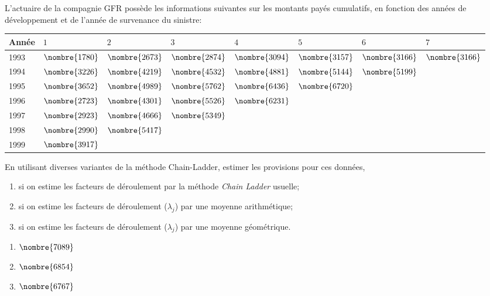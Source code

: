 \begin{exercice}
  L'actuaire de la compagnie GFR possède les informations suivantes
  sur les montants payés cumulatifs, en fonction des années de
  développement et de l'année de survenance du sinistre:
  \begin{center}
    \begin{tabular}{|l|l l l l l l l|}\hline
      Année & $1$ & $2$ & $3$ & $4$ & $5$ & $6$ & $7$\\ \hline
      1993 & $\nombre{1780}$ & $\nombre{2673}$ & $\nombre{2874}$ & $\nombre{3094}$ & $\nombre{3157}$ & $\nombre{3166}$ & $\nombre{3166}$ \\
      1994 & $\nombre{3226}$ & $\nombre{4219}$ & $\nombre{4532}$ & $\nombre{4881}$ & $\nombre{5144}$ & $\nombre{5199}$ & \\
      1995 & $\nombre{3652}$ & $\nombre{4989}$ & $\nombre{5762}$ & $\nombre{6436}$ & $\nombre{6720}$ & & \\
      1996 & $\nombre{2723}$ & $\nombre{4301}$ & $\nombre{5526}$ & $\nombre{6231}$ & & & \\
      1997 & $\nombre{2923}$ & $\nombre{4666}$ & $\nombre{5349}$ & & & & \\
      1998 & $\nombre{2990}$ & $\nombre{5417}$ & & & & & \\
      1999 & $\nombre{3917}$ & & & & & &\\ \hline
    \end{tabular}
  \end{center}
  En utilisant diverses variantes de la méthode Chain-Ladder, estimer
  les provisions pour ces données,
  \begin{enumerate}
  \item si on estime les facteurs de déroulement par la méthode
    \emph{Chain Ladder} usuelle;
  \item si on estime les facteurs de déroulement ($\lambda_j$) par une
    moyenne arithmétique;
  \item si on estime les facteurs de déroulement ($\lambda_j$) par une
    moyenne géométrique.
  \end{enumerate}
  \begin{rep}
    \begin{enumerate}
    \item $\nombre{7089}$
    \item $\nombre{6854}$
    \item $\nombre{6767}$
    \end{enumerate}
  \end{rep}
  \begin{sol}

\end{sol}
\end{exercice}
